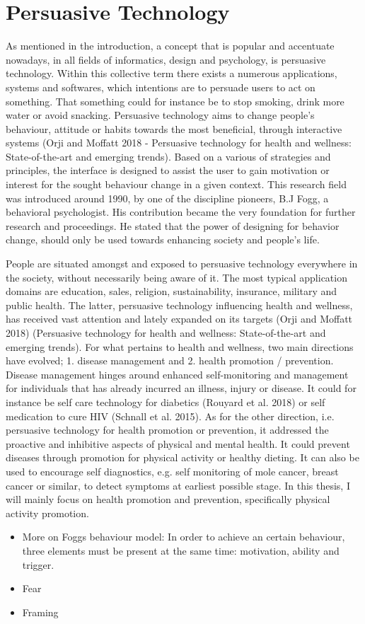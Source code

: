\section{Persuasive Technology}
As mentioned in the introduction, a concept that is popular and accentuate nowadays, in all fields of informatics, design and psychology, is persuasive technology. Within this collective term there exists a numerous applications, systems and softwares, which intentions are to persuade users to act on something. That something could for instance be to stop smoking, drink more water or avoid snacking. Persuasive technology aims to change people’s behaviour, attitude or habits towards the most beneficial, through interactive systems (Orji and Moffatt 2018 - Persuasive technology for health and wellness: State-of-the-art and emerging trends). Based on a various of strategies and principles, the interface is designed to assist the user to gain motivation or interest for the sought behaviour change in a given context. This research field was introduced around 1990, by one of the discipline pioneers, B.J Fogg, a behavioral psychologist. His contribution became the very foundation for further research and proceedings. He stated that the power of designing for behavior change, should only be used towards enhancing society and people's life. 

People are situated amongst and exposed to persuasive technology everywhere in the society, without necessarily being aware of it. The most typical application domains are education, sales, religion, sustainability, insurance, military and public health. The latter, persuasive technology influencing health and wellness, has received vast attention and lately expanded on its targets (Orji and Moffatt 2018) (Persuasive technology for health and wellness: State-of-the-art and emerging trends). For what pertains to health and wellness, two main directions have evolved; 1. disease management and 2. health promotion / prevention. Disease management hinges around enhanced self-monitoring and management for individuals that has already incurred an illness, injury or disease. It could for instance be self care technology for diabetics (Rouyard et al. 2018) or self medication to cure HIV (Schnall et al. 2015). As for the other direction, i.e. persuasive technology for health promotion or prevention, it addressed the proactive and inhibitive aspects of physical and mental health. It could prevent diseases through promotion for physical activity or healthy dieting. It can also be used to encourage self diagnostics, e.g. self monitoring of mole cancer, breast cancer or similar, to detect symptoms at earliest  possible stage. In this thesis, I will mainly focus on health promotion and prevention, specifically physical activity promotion. 
\begin{itemize}
\item More on Foggs behaviour model: In order to achieve an certain behaviour, three elements must be present at the same time: motivation, ability and trigger.  
\item  Fear 
\item Framing
\end{itemize}

